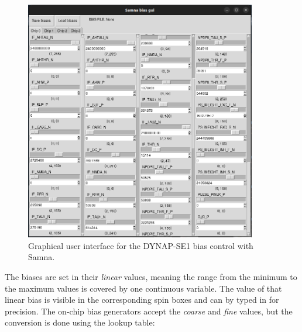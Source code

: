\begin{figure}[h!]
    \centering
        \includegraphics[width=0.9\textwidth]{img/appendices/Bias_gui_screenshot.png}
    \caption[Bias GUI screenshot]{Graphical user interface for the DYNAP-SE1 bias control with Samna.}
    \label{fig:bias_gui_screenshot}
\end{figure}

The biases are set in their \emph{linear} values, meaning the range from the minimum to the maximum values is covered by one continuous variable. The value of that linear bias is visible in the corresponding spin boxes and can by typed in for precision. The on-chip bias generators accept the \emph{coarse} and \emph{fine} values, but the conversion is done using the lookup table:

